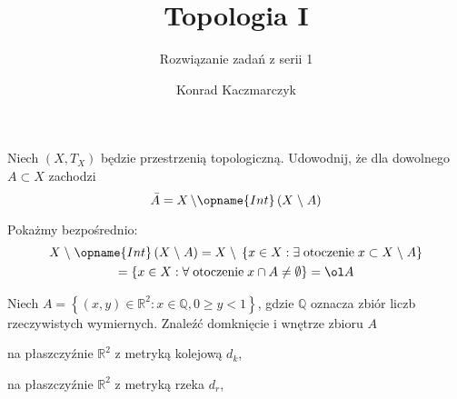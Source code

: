 \documentclass[11pt]{scrartcl}
\author{Konrad Kaczmarczyk}
\begin{document}
  \title{Topologia I}
  \subtitle{Rozwiązanie zadań z serii 1}
  \maketitle
    \begin{zadanie*}
        Niech $\left ( X, T_X \right )$ będzie przestrzenią topologiczną. Udowodnij, że dla dowolnego $A \subset X$ zachodzi
        \[
          \bar{A} = X \, \backslash \opname{Int} \left ( X \; \backslash \; A \right )
        \]
        
    \end{zadanie*}

   Pokażmy bezpośrednio: 
    \begin{gather*}
      X \; \backslash \; \opname{Int} \left ( X \; \backslash \; A \right ) = X \; \backslash \; \left \{ x \in X : \exists \; \text{otoczenie} \; x \subset X \; \backslash \; A \right \} \\
      = \left \{ x \in X : \forall \; \text{otoczenie} \; x \cap A \not = \emptyset \right \} = \ol A
    \end{gather*}
    
    \begin{zadanie*}
        Niech $A = \left \{ \left ( x,y \right ) \in \mathbb{R}^2 : x \in \mathbb{Q} , 0 \geq y < 1  \right \}$, gdzie $\mathbb{Q} $ oznacza zbiór liczb rzeczywistych wymiernych. Znaleźć domknięcie i wnętrze zbioru $A$ \begin{walk}
            \item na płaszczyźnie $\mathbb{R}^2$ z metryką kolejową $d_k$, \item na płaszczyźnie $\mathbb{R}^2$ z metryką rzeka $d_r$,
        \end{walk}
    \end{zadanie*}
    
\end{document}
